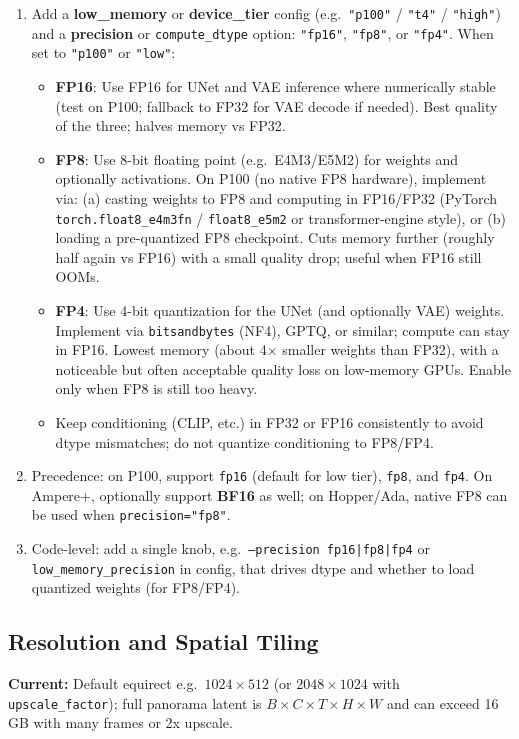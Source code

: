 \documentclass[11pt,a4paper]{article}
\newcommand{\fn}[1]{\texttt{#1}}
\begin{document}
\begin{enumerate}
    \item Add a \textbf{low\_memory} or \textbf{device\_tier} config (e.g.\ \fn{"p100"} / \fn{"t4"} / \fn{"high"}) and a \textbf{precision} or \fn{compute\_dtype} option: \fn{"fp16"}, \fn{"fp8"}, or \fn{"fp4"}. When set to \fn{"p100"} or \fn{"low"}:
    \begin{itemize}
        \item \textbf{FP16}: Use FP16 for UNet and VAE inference where numerically stable (test on P100; fallback to FP32 for VAE decode if needed). Best quality of the three; halves memory vs FP32.
        \item \textbf{FP8}: Use 8-bit floating point (e.g.\ E4M3/E5M2) for weights and optionally activations. On P100 (no native FP8 hardware), implement via: (a) casting weights to FP8 and computing in FP16/FP32 (PyTorch \fn{torch.float8\_e4m3fn} / \fn{float8\_e5m2} or transformer-engine style), or (b) loading a pre-quantized FP8 checkpoint. Cuts memory further (roughly half again vs FP16) with a small quality drop; useful when FP16 still OOMs.
        \item \textbf{FP4}: Use 4-bit quantization for the UNet (and optionally VAE) weights. Implement via \fn{bitsandbytes} (NF4), GPTQ, or similar; compute can stay in FP16. Lowest memory (about 4$\times$ smaller weights than FP32), with a noticeable but often acceptable quality loss on low-memory GPUs. Enable only when FP8 is still too heavy.
        \item Keep conditioning (CLIP, etc.) in FP32 or FP16 consistently to avoid dtype mismatches; do not quantize conditioning to FP8/FP4.
    \end{itemize}
    \item Precedence: on P100, support \fn{fp16} (default for low tier), \fn{fp8}, and \fn{fp4}. On Ampere+, optionally support \textbf{BF16} as well; on Hopper/Ada, native FP8 can be used when \fn{precision="fp8"}.
    \item Code-level: add a single knob, e.g.\ \fn{--precision fp16|fp8|fp4} or \fn{low\_memory\_precision} in config, that drives dtype and whether to load quantized weights (for FP8/FP4).
\end{enumerate}

\subsection{Resolution and Spatial Tiling}

\textbf{Current:} Default equirect e.g.\ $1024\times 512$ (or $2048\times 1024$ with \fn{upscale\_factor}); full panorama latent is $B\times C\times T\times H\times W$ and can exceed 16\,GB with many frames or 2x upscale.
\end{document}

